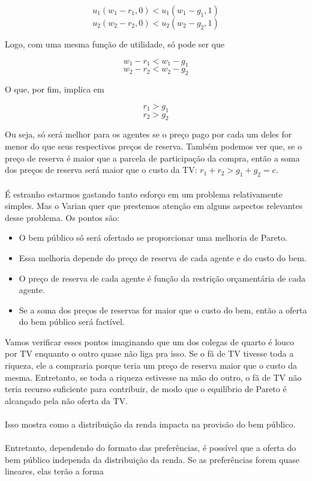 \documentclass[a4paper,11pt,oneside]{book}
\theoremstyle{definition}
\theoremstyle{break}
\begin{document}
$$u_1(w_1 - r_1,0) < u_1(w_1 - g_1,1)$$
$$u_2(w_2 - r_2,0) < u_2(w_2 - g_2,1)$$

Logo, com uma mesma função de utilidade, só pode ser que

$$w_1 - r_1 < w_1 - g_1$$
$$w_2 - r_2 < w_2 - g_2$$

O que, por fim, implica em

$$r_1 > g_1$$
$$r_2 > g_2$$

Ou seja, só será melhor para os agentes se o preço pago por cada um deles for menor do que seus respectivos preços de reserva. Também podemos ver que, se o preço de reserva é maior que a parcela de participação da compra, então a soma dos preços de reserva será maior que o custo da TV: $r_1 + r_2 > g_1 + g_2 = c$.
\\~\\
É estranho estarmos gastando tanto esforço em um problema relativamente simples. Mas o Varian quer que prestemos atenção em alguns aspectos relevantes desse problema. Os pontos são:

\begin{itemize}
	\item O bem público só será ofertado se proporcionar uma melhoria de Pareto.
	\item Essa melhoria depende do preço de reserva de cada agente e do custo do bem.
	\item O preço de reserva de cada agente é função da restrição orçamentária de cada agente.
	\item Se a soma dos preços de reservas for maior que o custo do bem, então a oferta do bem público será factível.
\end{itemize}

Vamos verificar esses pontos imaginando que um dos colegas de quarto é louco por TV enquanto o outro quase não liga pra isso. Se o fã de TV tivesse toda a riqueza, ele a compraria porque teria um preço de reserva maior que o custo da mesma. Entretanto, se toda a riqueza estivesse na mão do outro, o fã de TV não teria recurso suficiente para contribuir, de modo que o equilíbrio de Pareto é alcançado pela não oferta da TV.
\\~\\
Isso mostra como a distribuição da renda impacta na provisão do bem público.
\\~\\
Entretanto, dependendo do formato das preferências, é possível que a oferta do bem público independa da distribuição da renda. Se as preferências forem quase lineares, elas terão a forma
\end{document}
